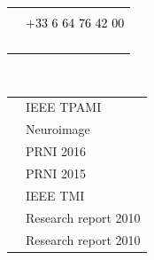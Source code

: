 \documentclass[letterpaper]{article}
\newcommand{\MYhref}[3][black]{\href{#2}{\color{#1}{#3}}}%
\begin{document}
\begin{minipage}{1\linewidth}
\begin{minipage}{0.5\linewidth}
\begin{minipage}{1\linewidth}
\begin{minipage}{1\linewidth}
\begin{tabularx}{1\textwidth}{rX}
				\faMobilePhone& 
				\textcolor{black}{\MYhref{ahoyosidrobo@gmail.com}{ahoyosidrobo@gmail.com}}\\
				\vspace{1ex}
				& \textcolor{black}{+33 6 64 76 42 00}\\				
				\vspace{1ex}
				\faHome    & 
				\textcolor{black}{\MYhref{https://ahoyosid.github.io/}{https://ahoyosid.github.io/}}\\
				\vspace{1ex}
				\faTwitter & 
				\textcolor{black}{\MYhref{twitter.com/ahoyosid}{twitter.com/ahoyosid}}\\
				\vspace{1ex}
				\faGithub  & 
				\textcolor{black}{\MYhref{github.com/ahoyosid}{github.com/ahoyosid}}\\
				\vspace{1ex}
				\faLinkedin & 
				\textcolor{black}{\MYhref{linkedin.com/in/andres-hoyos-idroboi-85b42024}{linkedin.com/in/andres-hoyos-idroboi-85b42024}}\\
			\end{tabularx}
		\end{minipage} 
	\end{minipage} %
	\begin{minipage}{1\linewidth} %
		\\
		\vspace{2ex}
		\begin{minipage}{1\linewidth}
			\begin{tabularx}{\textwidth}{cX}
				& {\normalsize \textmd{IEEE TPAMI}}\\
				& {\normalsize \textmd{Neuroimage}}\\
				& {\normalsize \textmd{PRNI 2016}}\\
				& {\normalsize \textmd{PRNI 2015}}\\
				& {\normalsize \textmd{IEEE TMI}}\\
				& {\normalsize \textmd{Research report 2010}}\\
				& {\normalsize \textmd{Research report 2010}}\\
			\end{tabularx}
		\end{minipage} 
	\end{minipage} %
	
\end{minipage}
\end{minipage}
\end{document}
